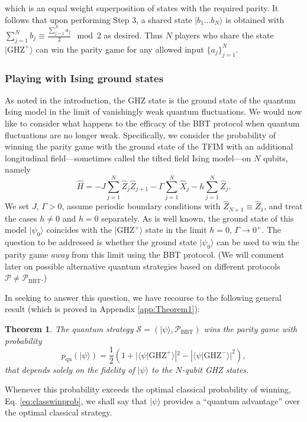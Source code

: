 \documentclass[prb,twocolumn,showpacs,amssymb,superscriptaddress]{revtex4-2}
\newtheorem{theorem}{Theorem}
\begin{document}
which is an equal weight superposition of states with the required parity. It follows that upon performing Step 3, a shared state $|b_1\ldots b_N\rangle$ is obtained with $\sum_{j=1}^N b_j \equiv \frac{\sum_{j=1}^N a_j}{2} \mod{2}$ as desired.
Thus $N$ players who share the state $|\mathrm{GHZ}^+\rangle$ can win the parity game for any allowed input $\{a_j\}_{j=1}^N$.

\subsubsection{Playing with Ising ground states}
As noted in the introduction, the GHZ state is the ground state of the quantum Ising model in the limit of vanishingly weak quantum fluctuations. We would now like to consider what happens to the efficacy of the BBT protocol when quantum fluctuations are no longer weak. Specifically, we consider the probability of winning the parity game with the ground state of the TFIM with an additional longitudinal field---sometimes called the tilted field Ising model---on $N$ qubits, namely
\begin{equation}
\label{eq:LTFIM}
\hat{H} = -J \sum_{j=1}^N \hat{Z}_j \hat{Z}_{j+1} - \Gamma \sum_{j=1}^N \hat{X}_j - h \sum_{j=1}^N \hat{Z}_j.
\end{equation}
We set $J,\, \Gamma > 0$, assume periodic boundary conditions with $\hat{Z}_{N+1} \equiv \hat{Z}_1$, and treat the cases $h \neq 0$ and $h=0$ separately. As is well known, the ground state of this model $|\psi_0\rangle$ coincides with the $|\mathrm{GHZ}^+\rangle$ state in the limit $h=0,\, \Gamma \to 0^+$. The question to be addressed is whether the ground state $|\psi_0\rangle$ can be used to win the parity game \emph{away} from this limit using the BBT protocol. (We will comment later on possible alternative quantum strategies based on different protocols $\mathcal{P} \neq \mathcal{P}_{\mathrm{BBT}}$.)

In seeking to answer this question, we have recourse to the following general result (which is proved in Appendix \ref{app:Theorem1}):

\begin{theorem}
\label{thm:thm}
The quantum strategy $\mathcal{S} = (|\psi\rangle, \mathcal{P}_{\mathrm{BBT}})$ wins the parity game with probability
\begin{equation}
\label{eq:exactquantum}
p_{\mathrm{qu}}(|\psi\rangle) = \frac{1}{2}\left(1+ |\langle \psi | \mathrm{GHZ}^+\rangle |^2 -|\langle \psi | \mathrm{GHZ}^-\rangle |^2\right),
\end{equation}
that depends solely on the fidelity of $|\psi\rangle$ to the $N$-qubit GHZ states.
\end{theorem}
Whenever this probability exceeds the optimal classical probability of winning, Eq. \eqref{eq:classwinprob}, we shall say that $|\psi\rangle$ provides a ``quantum advantage'' over the optimal classical strategy.
\end{document}

